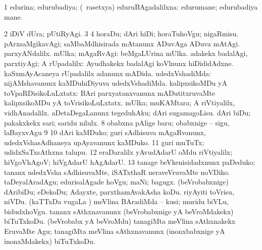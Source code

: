 {\noindent 
\gl{\pagu}
\expl{}
\bmng
\bnum
\num{1}  edurina; edurubadiya; (\kanmu\ rasetxya) eduruBAgadalilxna:  edurumane; edurubadiya mane. 
\num{2}  iDiV dUra; pUtiRyAgi. 
\num{3}  
\num{4}  horaDu; dAri hiDi; horaTuhoVgu; nigaRmisu. 
  
\banum
{} pArxsaMgikavAgi; saMbaMdhisirada mAtanunx ADuvAga ADuva mAtAgi. 
 parxyANdalilx. 
\eanum
\numie
{}  
\banum
{} mUlka; mAgaRvAgi:  beMgaLUrina mUlka. 
 adakekx badalAgi, parxtiyAgi; A rUpadalilx:  Ayudhakekx badalAgi koVlnunx hiDididAdxne.  kaSxmAyAcaneya rUpadalilx adanunx mADida. 
 udedxVshadiMda:  nijAMshavanunx kaMDuhiDiyuva udedxVshadiMda. 
 kalipxsikoMDu yA toVpaRDisikoLuLxtatx:  BAri parxyatanxvanunx mADutitxruvaMte kalipxsikoMDu yA toVrisikoLuLxtatx. 
 mUlka; muKAMtara; A riVtiyalilx, vidhAnadalilx. 
\eanum
\numie
{}  
\banum
{} aDetaDegaLanunx tegeduhAku; dAri sugamagoLisu. 
 dAri biDu; pakakxkekx sari; saridu nilulx. 
\eanum
\numie
\num{8}  obabxna pAlige baru; obabxnige -- sigu, laBayxvAgu 
\num{9}  
\num{10}  dAri kaMDuko; guri sAdhisuva mAgaRvanunx, udedxVshasAdhaneya upAyavanunx kaMDuko. 
\num{11}  guri muTuTx; udidxSaTxsAthxna talupu. 
\num{12}  eraDaralilx yAvudAdarU oMdu riVtiyalilx; hiVgoVhAgoV; hiVgAdarU hAgAdarU. 
\hypertarget{way pagu13}{} 
\num{13}  tanage beVkenisidadxnunx paDeduko; tananx udedxVsha sAdhisuvaMte, iSATxthaR neraveVruvaMte noVDiko. 
\banum
{} taDeyalAradAgu; edurisalAgade hoVgu; maNi; bagugx. 
 (beVrobabxnige) dAribiDu; eDekoDu; Adayxte, parxthamAvakAsha koDu. 
 riyAyiti toVrisu, niVDu. 
 (kaTTxDa \mo vugaLa \vi) meVlina BAradiMda -- kusi; muridu biVLu, bidudxhoVgu. 
\eanum
\numie
{}  
\banum
{} tananx sAthxnavanunx (beVrobabxnige yA beVroMdakekx) biTuTxkoDu. 
 (beVrobabx yA beVroMdu) tanagiMta meVlina sAthxnakekx EruvaMte Agu; tanagiMta meVlina sAthxnavanunx (inonxbabxnige yA inonxMdakekx) biTuTxkoDu. 
}
